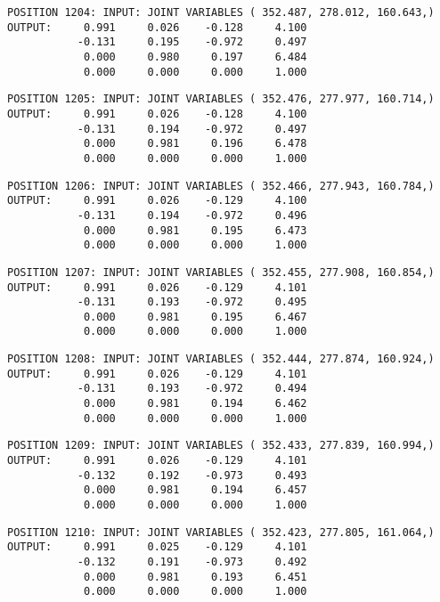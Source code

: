 \begin{verbatim}
POSITION 1204: INPUT: JOINT VARIABLES ( 352.487, 278.012, 160.643,)
OUTPUT:     0.991     0.026    -0.128     4.100
           -0.131     0.195    -0.972     0.497
            0.000     0.980     0.197     6.484
            0.000     0.000     0.000     1.000
\end{verbatim} \pagebreak[1]\begin{verbatim}
POSITION 1205: INPUT: JOINT VARIABLES ( 352.476, 277.977, 160.714,)
OUTPUT:     0.991     0.026    -0.128     4.100
           -0.131     0.194    -0.972     0.497
            0.000     0.981     0.196     6.478
            0.000     0.000     0.000     1.000
\end{verbatim} \pagebreak[1]\begin{verbatim}
POSITION 1206: INPUT: JOINT VARIABLES ( 352.466, 277.943, 160.784,)
OUTPUT:     0.991     0.026    -0.129     4.100
           -0.131     0.194    -0.972     0.496
            0.000     0.981     0.195     6.473
            0.000     0.000     0.000     1.000
\end{verbatim} \pagebreak[1]\begin{verbatim}
POSITION 1207: INPUT: JOINT VARIABLES ( 352.455, 277.908, 160.854,)
OUTPUT:     0.991     0.026    -0.129     4.101
           -0.131     0.193    -0.972     0.495
            0.000     0.981     0.195     6.467
            0.000     0.000     0.000     1.000
\end{verbatim} \pagebreak[1]\begin{verbatim}
POSITION 1208: INPUT: JOINT VARIABLES ( 352.444, 277.874, 160.924,)
OUTPUT:     0.991     0.026    -0.129     4.101
           -0.131     0.193    -0.972     0.494
            0.000     0.981     0.194     6.462
            0.000     0.000     0.000     1.000
\end{verbatim} \pagebreak[1]\begin{verbatim}
POSITION 1209: INPUT: JOINT VARIABLES ( 352.433, 277.839, 160.994,)
OUTPUT:     0.991     0.026    -0.129     4.101
           -0.132     0.192    -0.973     0.493
            0.000     0.981     0.194     6.457
            0.000     0.000     0.000     1.000
\end{verbatim} \pagebreak[1]\begin{verbatim}
POSITION 1210: INPUT: JOINT VARIABLES ( 352.423, 277.805, 161.064,)
OUTPUT:     0.991     0.025    -0.129     4.101
           -0.132     0.191    -0.973     0.492
            0.000     0.981     0.193     6.451
            0.000     0.000     0.000     1.000
\end{verbatim} \pagebreak[1]\begin{verbatim}

\end{verbatim}
